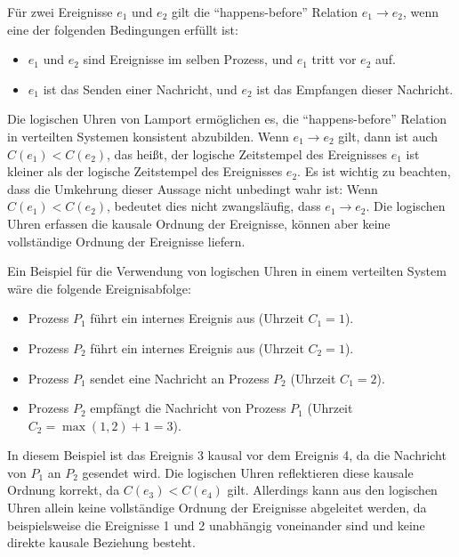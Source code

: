 Für zwei Ereignisse $e_1$ und $e_2$ gilt die \enquote{happens-before} Relation $e_1 \to e_2$, wenn eine der folgenden Bedingungen erfüllt ist:
\begin{itemize}
\item $e_1$ und $e_2$ sind Ereignisse im selben Prozess, und $e_1$ tritt vor $e_2$ auf.
\item $e_1$ ist das Senden einer Nachricht, und $e_2$ ist das Empfangen dieser Nachricht.
\end{itemize}  
Die logischen Uhren von Lamport ermöglichen es, die \enquote{happens-before} Relation in verteilten Systemen konsistent abzubilden. Wenn $e_1 \to e_2$ gilt, dann ist auch $C(e_1) < C(e_2)$, das heißt, der logische Zeitstempel des Ereignisses $e_1$ ist kleiner als der logische Zeitstempel des Ereignisses $e_2$. Es ist wichtig zu beachten, dass die Umkehrung dieser Aussage nicht unbedingt wahr ist: Wenn $C(e_1) < C(e_2)$, bedeutet dies nicht zwangsläufig, dass $e_1 \to e_2$. Die logischen Uhren erfassen die kausale Ordnung der Ereignisse, können aber keine vollständige Ordnung der Ereignisse liefern.

Ein Beispiel für die Verwendung von logischen Uhren in einem verteilten System wäre die folgende Ereignisabfolge:
\begin{itemize}
\item Prozess $P_1$ führt ein internes Ereignis aus (Uhrzeit $C_1 = 1$).
\item Prozess $P_2$ führt ein internes Ereignis aus (Uhrzeit $C_2 = 1$).
\item Prozess $P_1$ sendet eine Nachricht an Prozess $P_2$ (Uhrzeit $C_1 = 2$).
\item Prozess $P_2$ empfängt die Nachricht von Prozess $P_1$ (Uhrzeit $C_2 = \max(1, 2) + 1 = 3$).
\end{itemize}  

In diesem Beispiel ist das Ereignis 3 kausal vor dem Ereignis 4, da die Nachricht von $P_1$ an $P_2$ gesendet wird. Die logischen Uhren reflektieren diese kausale Ordnung korrekt, da $C(e_3) < C(e_4)$ gilt. Allerdings kann aus den logischen Uhren allein keine vollständige Ordnung der Ereignisse abgeleitet werden, da beispielsweise die Ereignisse 1 und 2 unabhängig voneinander sind und keine direkte kausale Beziehung besteht.
